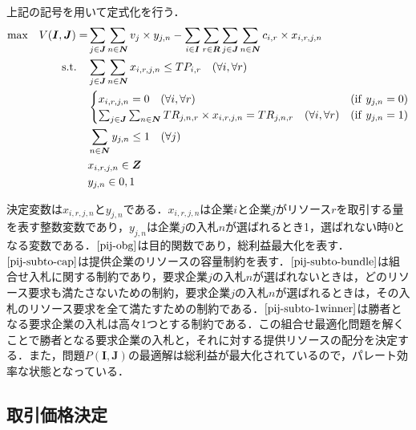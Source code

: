 上記の記号を用いて定式化を行う． \begin{align}
  {\rm max}\quad  V(\boldsymbol{I},\boldsymbol{J})=&\sum_{j\in \boldsymbol{J}}\sum_{n\in\boldsymbol{N}}v_{j} \times y_{j,n} - \sum_{i\in\boldsymbol{I}}\sum_{r\in\boldsymbol{R}}\sum_{j\in\boldsymbol{J}}\sum_{n\in\boldsymbol{N}}c_{i,r} \times x_{i,r,j,n} \label{pij-obj}\\
    {\rm s.t.} \quad &\sum_{j\in \boldsymbol{J}}\sum_{n\in\boldsymbol{N}}x_{i,r,j,n} \leq TP_{i,r} \quad (\forall i, \forall r) \label{pij-subto-cap}\\
  &\begin{cases}
    x_{i,r,j,n} = 0 \quad (\forall i, \forall r)&({\rm if} \ y_{j,n}=0) \\
    \sum_{j \in \boldsymbol{J}}\sum_{n\in\boldsymbol{N}} TR_{j,n,r} \times x_{i,r,j,n} = TR_{j,n,r}
    \quad  (\forall i, \forall r)&({\rm if} \ y_{j,n}=1) 
  \end{cases}\label{pij-subto-bundle}\\
    &\sum_{n\in \boldsymbol{N}}y_{j,n}  \leq 1 \quad (\forall j) \label{pij-subto-1winner}\\
    &x_{i,r,j,n} \in \boldsymbol{Z}\label{pij-decision-x}\\
    &y_{j,n} \in {0,1} \label{pij-decision-y}
\end{align}

決定変数は\(x_{i,r,j,n}\)と\(y_{j,n}\)である．\(x_{i,r,j,n}\)は企業\(i\)と企業\(j\)がリソース\(r\)を取引する量を表す整数変数であり，\(y_{j,n}\)は企業\(j\)の入札\(n\)が選ばれるとき1，選ばれない時0となる変数である．\(\eqref{pij-obg}\)は目的関数であり，総利益最大化を表す．\(\eqref{pij-subto-cap}\)は提供企業のリソースの容量制約を表す．\(\eqref{pij-subto-bundle}\)は組合せ入札に関する制約であり，要求企業\(j\)の入札\(n\)が選ばれないときは，どのリソース要求も満たさないための制約，要求企業\(j\)の入札\(n\)が選ばれるときは，その入札のリソース要求を全て満たすための制約である．\(\eqref{pij-subto-1winner}\)は勝者となる要求企業の入札は高々1つとする制約である．この組合せ最適化問題を解くことで勝者となる要求企業の入札と，それに対する提供リソースの配分を決定する．また，問題\(P(\boldsymbol{I},\boldsymbol{J})\)の最適解は総利益が最大化されているので，パレート効率な状態となっている．

\hypertarget{ux53d6ux5f15ux4fa1ux683cux6c7aux5b9a}{%
\subsection{取引価格決定}\label{ux53d6ux5f15ux4fa1ux683cux6c7aux5b9a}}

